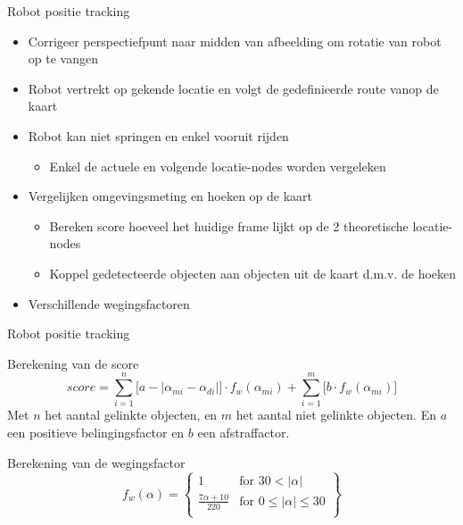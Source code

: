 \documentclass[11pt,t]{beamer}
\begin{document}
\begin{frame}[fragile]{Robot positie tracking}
	\begin{itemize}
		\item Corrigeer perspectiefpunt naar midden van afbeelding om rotatie van robot op te vangen
		\item Robot vertrekt op gekende locatie en volgt de gedefinieerde route vanop de kaart
		\item Robot kan niet springen en enkel vooruit rijden
		\begin{itemize}
			\item Enkel de actuele en volgende locatie-nodes worden vergeleken
		\end{itemize}
		
		\item Vergelijken omgevingsmeting en hoeken op de kaart
		\begin{itemize}
			\item Bereken score hoeveel het huidige frame lijkt op de 2 theoretische locatie-nodes
			\item Koppel gedetecteerde objecten aan objecten uit de kaart d.m.v. de hoeken
		\end{itemize}

		\item Verschillende wegingsfactoren
	\end{itemize}
\end{frame}

\begin{frame}[fragile]{Robot positie tracking}
	\begin{block}{Berekening van de score}
		\[
			score = \sum_{i=1}^{n}\big[a - |\alpha_{mi} - \alpha_{di}|\big] \cdot f_w(\alpha_{mi}) + \sum_{i=1}^{m}\big[b \cdot f_w(\alpha_{mi})\big]
		\]
		\centering
		Met $n$ het aantal gelinkte objecten, en $m$ het aantal niet gelinkte objecten. En $a$ een positieve belingingsfactor en $b$ een afstraffactor.
	\end{block}
	\begin{block}{Berekening van de wegingsfactor}
		\[
			f_w(\alpha) = \left\{\begin{array}{lr}
				1 & \text{for } 30 < |\alpha|\\
				\frac{7\alpha + 10}{220} & \text{for } 0 \leq |\alpha| \leq 30\\
			\end{array}
			\right\}
		\]
	\end{block}
\end{frame}
\end{document}
